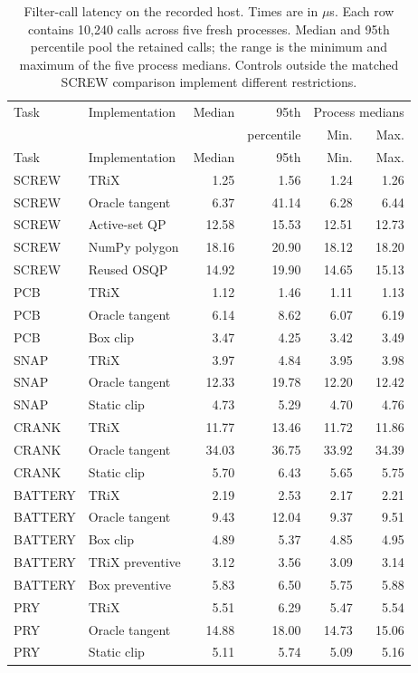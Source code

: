 \begin{longtable}{llrrrr}
\caption{Filter-call latency on the recorded host. Times are in $\mu$s.
Each row contains 10,240 calls across five fresh processes. Median and
95th percentile pool the retained calls; the range is the minimum and
maximum of the five process medians. Controls outside the matched SCREW
comparison implement different restrictions.}\label{tab:runtime-latency}\\
\toprule Task & Implementation & Median & 95th & \multicolumn{2}{c}{Process medians}\\
 & & & percentile & Min. & Max.\\\midrule\endfirsthead
\toprule Task & Implementation & Median & 95th & Min. & Max.\\\midrule\endhead
\bottomrule\endfoot
SCREW & TRiX & 1.25 & 1.56 & 1.24 & 1.26\\
SCREW & Oracle tangent & 6.37 & 41.14 & 6.28 & 6.44\\
SCREW & Active-set QP & 12.58 & 15.53 & 12.51 & 12.73\\
SCREW & NumPy polygon & 18.16 & 20.90 & 18.12 & 18.20\\
SCREW & Reused OSQP & 14.92 & 19.90 & 14.65 & 15.13\\
PCB & TRiX & 1.12 & 1.46 & 1.11 & 1.13\\
PCB & Oracle tangent & 6.14 & 8.62 & 6.07 & 6.19\\
PCB & Box clip & 3.47 & 4.25 & 3.42 & 3.49\\
SNAP & TRiX & 3.97 & 4.84 & 3.95 & 3.98\\
SNAP & Oracle tangent & 12.33 & 19.78 & 12.20 & 12.42\\
SNAP & Static clip & 4.73 & 5.29 & 4.70 & 4.76\\
CRANK & TRiX & 11.77 & 13.46 & 11.72 & 11.86\\
CRANK & Oracle tangent & 34.03 & 36.75 & 33.92 & 34.39\\
CRANK & Static clip & 5.70 & 6.43 & 5.65 & 5.75\\
BATTERY & TRiX & 2.19 & 2.53 & 2.17 & 2.21\\
BATTERY & Oracle tangent & 9.43 & 12.04 & 9.37 & 9.51\\
BATTERY & Box clip & 4.89 & 5.37 & 4.85 & 4.95\\
BATTERY & TRiX preventive & 3.12 & 3.56 & 3.09 & 3.14\\
BATTERY & Box preventive & 5.83 & 6.50 & 5.75 & 5.88\\
PRY & TRiX & 5.51 & 6.29 & 5.47 & 5.54\\
PRY & Oracle tangent & 14.88 & 18.00 & 14.73 & 15.06\\
PRY & Static clip & 5.11 & 5.74 & 5.09 & 5.16\\
\end{longtable}
